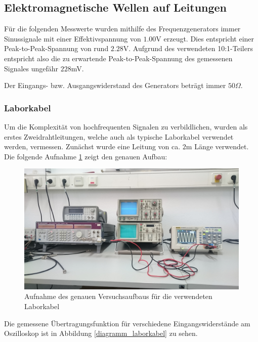 \subsection{Elektromagnetische Wellen auf Leitungen} %
\label{sub:elektromagnetische_wellen_auf_leitungen}

	Für die folgenden Messwerte wurden mithilfe des Frequenzgenerators immer Sinussignale mit einer Effektivspannung von $1.00$V erzeugt.
	Dies entspricht einer Peak-to-Peak-Spannung von rund $2.28$V.
	Aufgrund des verwendeten 10:1-Teilers entspricht also die zu erwartende Peak-to-Peak-Spannung des gemessenen Signales ungefähr $228$mV.

	Der Eingangs- bzw. Ausgangswiderstand des Generators beträgt immer $50\Omega$.\\

	\subsubsection{Laborkabel} %
	\label{ssub:laborkabel}
	
		Um die Komplexität von hochfrequenten Signalen zu verbildlichen, wurden als erstes Zweidrahtleitungen, welche auch als typische Laborkabel verwendet werden, vermessen. 
		Zunächst wurde eine Leitung von ca. $2$m Länge verwendet. 
		Die folgende Aufnahme \ref{versuchsaufbau_laborkabel} zeigt den genauen Aufbau:

		\begin{figure}[H]
			\center
			\includegraphics[scale = 0.09]{messwerte/DSC_0548.JPG}
			\caption{\centering Aufnahme des genauen Versuchsaufbaus für die verwendeten Laborkabel} %
			\label{versuchsaufbau_laborkabel}
		\end{figure}

		Die gemessene Übertragungsfunktion für verschiedene Eingangswiderstände am Oszilloskop ist in Abbildung \ref{diagramm_laborkabel} zu sehen.

